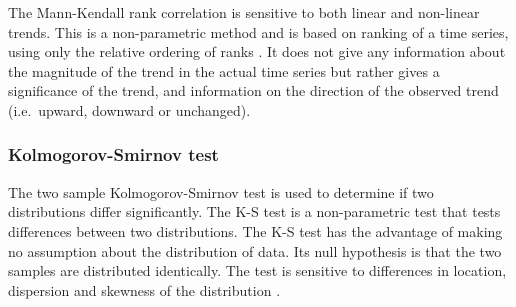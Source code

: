 The Mann-Kendall rank correlation \citep{mann1945-245,kendall1975-202} is
sensitive to both linear and non-linear trends. This is a non-parametric method
and is based on ranking of a time series, using only the relative ordering of
ranks \citep{press1996-933}. It does not give any information about the
magnitude of the trend in the actual time series but rather gives a significance
of the trend, and information on the direction of the observed trend (i.e.\
upward, downward or unchanged).

%
%
%
%
%

\subsubsection{Kolmogorov-Smirnov test}
\label{sec:KolmogorovSmirnovTest}
The two sample Kolmogorov-Smirnov test is used to determine if two distributions
differ significantly. The K-S test is a non-parametric test that tests
differences between two distributions. The K-S test has the advantage of making
no assumption about the distribution of data. Its null hypothesis is that the
two samples are distributed identically. The test is sensitive to differences in
location, dispersion and skewness of the distribution \citep{sokal1995-887}.


